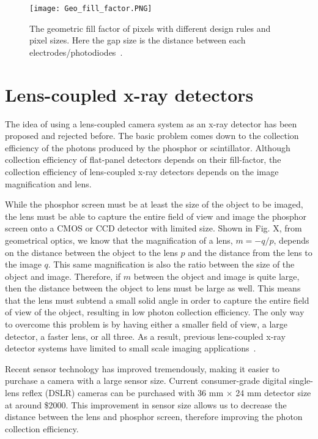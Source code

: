 \begin{figure}
\texttt{[image: Geo\_fill\_factor.PNG]}
\caption{The geometric fill factor of pixels with different design rules and pixel sizes.  Here the gap size is the distance between each electrodes/photodiodes~\citep{Rowlands2000}.}
\label{fig:fill_factor}
\end{figure}

\section{Lens-coupled x-ray detectors}
The idea of using a lens-coupled camera system as an x-ray detector has been proposed and rejected before.  The basic problem comes down to the collection efficiency of the photons produced by the phosphor or scintillator.  Although collection efficiency of flat-panel detectors depends on their fill-factor, the collection efficiency of lens-coupled x-ray detectors depends on the image magnification and lens.

While the phosphor screen must be at least the size of the object to be imaged, the lens must be able to capture the entire field of view and image the phosphor screen onto a CMOS or CCD detector with limited size.  Shown in Fig. X, from geometrical optics, we know that the magnification of a lens, $m = -q/p$, depends on the distance between the object to the lens $p$ and the distance from the lens to the image $q$.  This same magnification is also the ratio between the size of the object and image.  Therefore, if $m$ between the object and image is quite large, then the distance between the object to lens must be large as well.  This means that the lens must subtend a small solid angle in order to capture the entire field of view of the object, resulting in low photon collection efficiency.  The only way to overcome this problem is by having either a smaller field of view, a large detector, a faster lens, or all three.  As a result, previous lens-coupled x-ray detector systems have limited to small scale imaging applications~\citep{lee2001, kim2005, tate2005, madden2006}.  

Recent sensor technology has improved tremendously, making it easier to purchase a camera with a large sensor size.  Current consumer-grade digital single-lens reflex (DSLR) cameras can be purchased with 36 mm $\times$ 24 mm detector size at around \$2000.  This improvement in sensor size allows us to decrease the distance between the lens and phosphor screen, therefore improving the photon collection efficiency.

